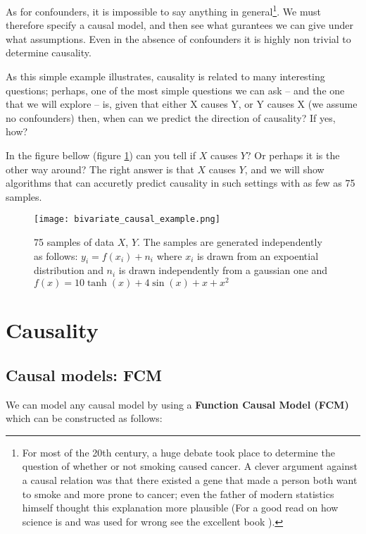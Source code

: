 As for confounders, it is impossible to say anything in general\footnote{
    For most of the 20th century, a huge debate took place to determine the question of whether or not 
    smoking caused cancer. A clever argument against a causal relation was that there existed a gene that 
    made a person both want to smoke and more prone to cancer; even the father of modern statistics
    himself thought this explanation more plausible (For a good read on how science is and was used 
    for wrong see the excellent book \cite{NaomiMerchants}).
    
}. We must therefore specify a causal model, and
then see what gurantees we can give under what assumptions. Even in the absence of confounders it is highly 
non trivial to determine causality.

As this simple example illustrates, causality is related to many interesting questions; perhaps, one of the most 
simple questions we can ask -- and the one that we will explore -- is, given that either X causes Y, or Y causes X
(we assume no confounders) then, when 
can we predict the direction of causality? If yes, how? 

In the figure bellow (figure \ref{fig:simple_bivariate_example}) can you tell if $X$ causes $Y$? Or perhaps
it is the other way around? The right answer is that $X$ causes $Y$, and we will show algorithms that 
can accuretly predict causality in such settings with as few as 75 samples. 

\begin{figure}[H]
    \centering
    \texttt{[image: bivariate\_causal\_example.png]}
    \caption{75 samples of data $X$, $Y$.  The samples are generated independently as follows:
    $y_i = f(x_i) + n_i$ where $x_i$ is drawn from an expoential distribution and $n_i$ is drawn 
    independently from a gaussian one and $f(x) = 10 \tanh(x) + 4\sin(x) + x + x^2$}
    \label{fig:simple_bivariate_example}
\end{figure}

\section{Causality}

\subsection{Causal models: FCM}

We can model any causal model by using a \textbf{Function Causal Model (FCM)} which can be constructed as follows:

